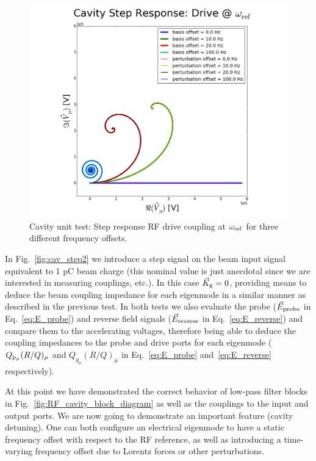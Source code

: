 \documentclass[a4paper,12pt]{article}
\begin{document}
\begin{figure}
\centering
\includegraphics[scale=0.3]{../figures/cavity_test_freqs.png}
\caption{Cavity unit test: Step response RF drive coupling at $\omega_{\rm ref}$ for three different frequency offsets.}
\label{fig:cav_step3}
\end{figure}

In Fig.~\ref{fig:cav_step2} we introduce a step signal on the beam input signal equivalent to 1 pC beam charge (this nominal value is just anecdotal since we are interested in measuring couplings, etc.). In this case $\vec K_{\rm g}=0$, providing means to deduce the beam coupling impedance for each eigenmode in a similar manner as described in the previous test. In both tests we also evaluate the probe ($\vec E_{\rm probe}$ in Eq.~\ref{eq:E_probe}) and reverse field signals ($\vec E_{\rm reverse}$ in Eq.~\ref{eq:E_reverse}) and compare them to the accelerating voltages, therefore being able to deduce the coupling impedances to the probe and drive ports for each eigenmode ($Q_{\rm p_{\mu}}(R/Q)_{\mu}$ and $Q_{g_{\mu}}(R/Q)_\mu$ in Eq.~\ref{eq:E_probe} and~\ref{eq:E_reverse} respectively).


At this point we have demonstrated the correct behavior of low-pass filter blocks in Fig.~\ref{fig:RF_cavity_block_diagram} as well as the couplings to the input and output ports. We are now going to demonstrate an important feature (cavity detuning). One can both configure an electrical eigenmode to have a static frequency offset with respect to the RF reference, as well as introducing a time-varying frequency offset due to Lorentz forces or other perturbations.
\end{document}

